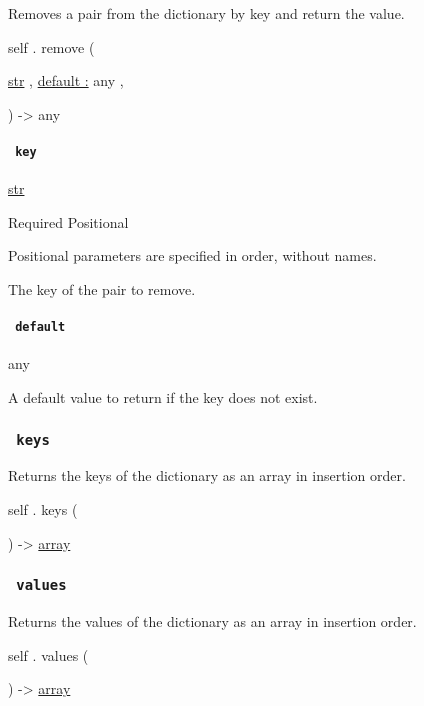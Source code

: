 Removes a pair from the dictionary by key and return the value.

self { . } { remove } (

{ \href{/docs/reference/foundations/str/}{str} , } {
\hyperref[definitions-remove-parameters-default]{default :} { any } , }

) -\textgreater{} { any }

\paragraph{\texorpdfstring{\texttt{\ key\ }}{ key }}\label{definitions-remove-key}

\href{/docs/reference/foundations/str/}{str}

{Required} {{ Positional }}

\label{definitions-remove-key-positional-tooltip}
Positional parameters are specified in order, without names.

The key of the pair to remove.

\paragraph{\texorpdfstring{\texttt{\ default\ }}{ default }}\label{definitions-remove-default}

{ any }

A default value to return if the key does not exist.

\subsubsection{\texorpdfstring{\texttt{\ keys\ }}{ keys }}\label{definitions-keys}

Returns the keys of the dictionary as an array in insertion order.

self { . } { keys } (

) -\textgreater{} \href{/docs/reference/foundations/array/}{array}

\subsubsection{\texorpdfstring{\texttt{\ values\ }}{ values }}\label{definitions-values}

Returns the values of the dictionary as an array in insertion order.

self { . } { values } (

) -\textgreater{} \href{/docs/reference/foundations/array/}{array}

